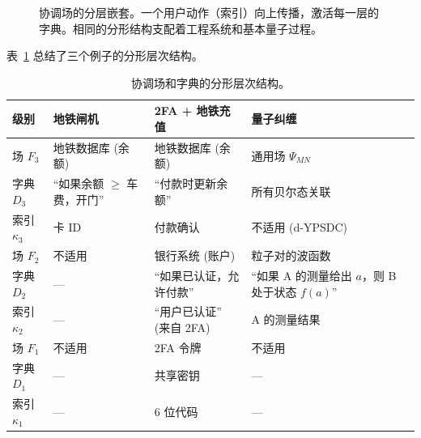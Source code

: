 \documentclass[12pt,a4paper]{article}
\theoremstyle{remark}
\begin{document}
	\begin{figure}[htbp]
		\centering
		\caption{协调场的分层嵌套。一个用户动作（索引）向上传播，激活每一层的字典。相同的分形结构支配着工程系统和基本量子过程。}
		\label{fig:hierarchy}
	\end{figure}
	
	表~\ref{tab:fractal-examples} 总结了三个例子的分形层次结构。
	
	\begin{table}[htbp]
		\centering
		\caption{协调场和字典的分形层次结构。}
		\label{tab:fractal-examples}
		\small
		\begin{tabular}{p{2.5cm} p{3.5cm} p{3.5cm} p{3.5cm}}
			\toprule
			\textbf{级别} & \textbf{地铁闸机} & \textbf{2FA + 地铁充值} & \textbf{量子纠缠} \\
			\midrule
			场 $F_3$ & 地铁数据库 (余额) & 地铁数据库 (余额) & 通用场 $\Psi_{MN}$ \\
			字典 $D_3$ & “如果余额 $\ge$ 车费，开门” & “付款时更新余额” & 所有贝尔态关联 \\
			索引 $\kappa_3$ & 卡 ID & 付款确认 & 不适用 (d-YPSDC) \\
			\midrule
			场 $F_2$ & 不适用 & 银行系统 (账户) & 粒子对的波函数 \\
			字典 $D_2$ & --- & “如果已认证，允许付款” & “如果 A 的测量给出 $a$，则 B 处于状态 $f(a)$” \\
			索引 $\kappa_2$ & --- & “用户已认证” (来自 2FA) & A 的测量结果 \\
			\midrule
			场 $F_1$ & 不适用 & 2FA 令牌 & 不适用 \\
			字典 $D_1$ & --- & 共享密钥 & --- \\
			索引 $\kappa_1$ & --- & 6 位代码 & --- \\
			\bottomrule
		\end{tabular}
	\end{table}
	
\end{document}
